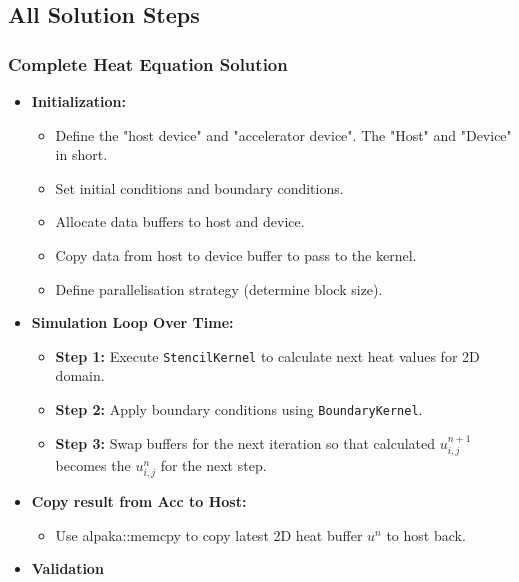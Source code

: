\documentclass[9pt]{beamer}
\begin{document}
\subsection{All Solution Steps}
\begin{frame}
\frametitle{Complete Heat Equation Solution}
\begin{itemize}
    \item \textbf{Initialization:}
    \begin{itemize}
        \item Define the "host device" and "accelerator device". The "Host" and "Device" in short.
        \item Set initial conditions and boundary conditions.
        \item Allocate data buffers to host and device.
        \item Copy data from host to device buffer to pass to the kernel.
        \item Define parallelisation strategy (determine block size).
    \end{itemize}
    \item \textbf{Simulation Loop Over Time:}
    \begin{itemize}
        \item \textbf{Step 1:} Execute \texttt{StencilKernel} to calculate next heat values for 2D domain.
        \item \textbf{Step 2:} Apply boundary conditions using \texttt{BoundaryKernel}.
        \item \textbf{Step 3:} Swap buffers for the next iteration so that calculated  $u_{i,j}^{n+1}$ becomes the $u_{i,j}^{n}$ for the next step.
    \end{itemize}
    \item \textbf{Copy result from Acc to Host:}
    \begin{itemize}
        \item Use alpaka::memcpy to copy latest 2D heat buffer $u^{n}$ to host back.
    \end{itemize}
    \item \textbf{Validation}
\end{itemize}
\end{frame}
\end{document}
